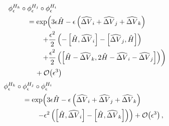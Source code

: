 \documentclass{article}
\begin{document}
\begin{align*}
\phi^{H_{k}}_{\epsilon} \circ \phi^{H_{j}}_{\epsilon} \circ \phi^{H_{i}}_{\epsilon}
&
\\
& \hspace{-15mm} =
\exp \! \left( 
3 \epsilon \hat{H} 
- \epsilon \left( \widehat{ \Delta V}_{i} +  \widehat{ \Delta V}_{j} +  \widehat{ \Delta V}_{k} \right)
\right.
\\
& \hspace{-8mm} \left.
+ \frac{\epsilon^{2}}{2} \left(
- \left[ \hat{H}, \widehat{ \Delta V}_{i} \right]
- \left[ \widehat{ \Delta V}_{j}, \hat{H} \right] \right) \right.
\\
& \hspace{-8mm} \left.
+ \frac{\epsilon^{2}}{2} \left(
\left[ \hat{H} - \widehat{ \Delta V}_{k}, 2 \hat{H} - \widehat{ \Delta V}_{i} - \widehat{ \Delta V}_{j} \right]
\right)
\right)
\\
& \hspace{-11mm} + \mathcal{O} \! \left( \epsilon^{3} \right)
\end{align*}
%
\begin{align*}
\phi^{H_{k}}_{\epsilon} \circ \phi^{H_{j}}_{\epsilon} \circ \phi^{H_{i}}_{\epsilon}
\\
& \hspace{-15mm} =
\exp \! \left( 
3 \epsilon \hat{H} 
- \epsilon \left( \widehat{ \Delta V}_{i} + \widehat{ \Delta V}_{j} + \widehat{ \Delta V}_{k} \right)
\right.
\\
& \hspace{-8mm} \left.
- \epsilon^{2} \left( \left[ \hat{H}, \widehat{ \Delta V}_{i} \right] 
- \left[ \hat{H}, \widehat{ \Delta V}_{k} \right] \right)
\right) + \mathcal{O} \! \left( \epsilon^{3} \right),
\end{align*}
\end{document}
